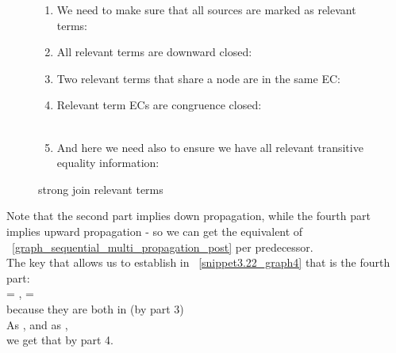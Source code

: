 \begin{figure}
\begin{enumerate}
	\item We need to make sure that all sources are marked as relevant terms:\\
	\item All relevant terms are downward closed:\\
	\item Two relevant terms that share a  node are in the same  EC:\\
	\item Relevant term ECs are congruence closed:\\
		\\
	\item And here we need also to ensure we have all relevant transitive equality information:\\
\end{enumerate}
\caption{strong join relevant terms}
\label{strong_join_relevant_terms}
\end{figure}


Note that the second part implies down propagation, while the fourth part implies upward propagation - 
so we can get the equivalent of ~\ref{graph_sequential_multi_propagation_post} per predecessor.\\
The key that allows us to establish in  ~\ref{snippet3.22_graph4} that 
is the fourth part:\\
 = ,  =  \\
 because they are both in  (by part 3)\\
As , and as \m{g([c]_{p_0}) \in \GFAECs{[g(c)_{p_0}}}, \\
we get that  by part 4.

